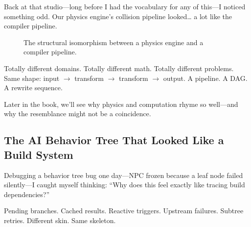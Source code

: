 Back at that studio—long before I had the vocabulary for any of this—I noticed something odd. Our physics engine's collision pipeline looked… a lot like the compiler pipeline.

\begin{figure}[h]
    \centering
    \caption{The structural isomorphism between a physics engine and a compiler pipeline.}
\end{figure}

Totally different domains. Totally different math. Totally different problems. Same shape:  
input $\rightarrow$ transform $\rightarrow$ transform $\rightarrow$ output.  
A pipeline. A DAG. A rewrite sequence.

Later in the book, we’ll see why physics and computation rhyme so well—and why the resemblance might not be a coincidence.

\subsection{The AI Behavior Tree That Looked Like a Build System}

Debugging a behavior tree bug one day—NPC frozen because a leaf node failed silently—I caught myself thinking: ``Why does this feel exactly like tracing build dependencies?''

Pending branches. Cached results. Reactive triggers. Upstream failures. Subtree retries.  
Different skin. Same skeleton.

